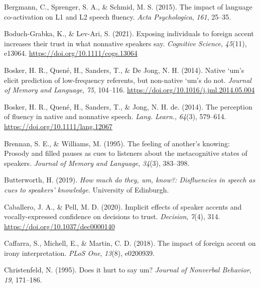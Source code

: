 \documentclass[
  man,floatsintext]{apa6}
\newlength{\cslhangindent}
\newlength{\cslentryspacingunit} %
\newenvironment{CSLReferences}[2] %
 {%
  \setlength{\parindent}{0pt}
  \ifodd #1
  \let\oldpar\par
  \def\par{\hangindent=\cslhangindent\oldpar}
  \fi
  \setlength{\parskip}{#2\cslentryspacingunit}
 }%
 {}
\begin{document}
\begin{CSLReferences}{1}{0}
\leavevmode{}%
Bergmann, C., Sprenger, S. A., \& Schmid, M. S. (2015). The impact of language co-activation on {L1} and {L2} speech fluency. \emph{Acta {Psychologica}}, \emph{161}, 25--35.

\leavevmode{}%
Boduch-Grabka, K., \& Lev-Ari, S. (2021). Exposing individuals to foreign accent increases their trust in what nonnative speakers say. \emph{Cognitive Science}, \emph{45}(11), e13064. \url{https://doi.org/10.1111/cogs.13064}

\leavevmode{}%
Bosker, H. R., Quené, H., Sanders, T., \& De Jong, N. H. (2014). Native `um's elicit prediction of low-frequency referents, but non-native `um's do not. \emph{Journal of Memory and Language}, \emph{75}, 104--116. \url{https://doi.org/10.1016/j.jml.2014.05.004}

\leavevmode{}%
Bosker, H. R., Quené, H., Sanders, T., \& Jong, N. H. de. (2014). The perception of fluency in native and nonnative speech. \emph{Lang. Learn.}, \emph{64}(3), 579--614. \url{https://doi.org/10.1111/lang.12067}

\leavevmode{}%
Brennan, S. E., \& Williams, M. (1995). The feeling of another's knowing: Prosody and filled pauses as cues to listeners about the metacognitive states of speakers. \emph{Journal of Memory and Language}, \emph{34}(3), 383--398.

\leavevmode{}%
Butterworth, H. (2019). \emph{How much do they, um, know?: Disfluencies in speech as cues to speakers' knowledge.} University of Edinburgh.

\leavevmode{}%
Caballero, J. A., \& Pell, M. D. (2020). Implicit effects of speaker accents and vocally-expressed confidence on decisions to trust. \emph{Decision}, \emph{7}(4), 314. \url{https://doi.org/10.1037/dec0000140}

\leavevmode{}%
Caffarra, S., Michell, E., \& Martin, C. D. (2018). The impact of foreign accent on irony interpretation. \emph{{PLoS} One}, \emph{13}(8), e0200939.

\leavevmode{}%
Christenfeld, N. (1995). Does it hurt to say um? \emph{Journal of Nonverbal Behavior}, \emph{19}, 171--186.


\end{CSLReferences}
\end{document}
